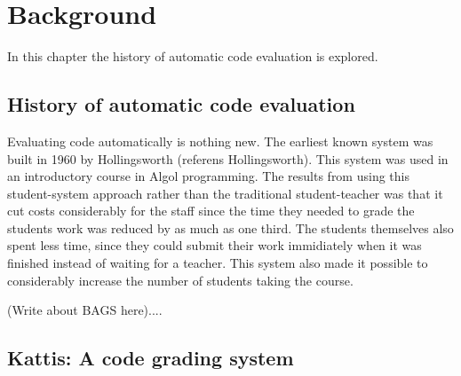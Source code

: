 \chapter{Background}
In this chapter the history of automatic code evaluation is explored.

\section{History of automatic code evaluation}
Evaluating code automatically is nothing new. The earliest known system was built in 1960 by Hollingsworth (referens Hollingsworth). This system was used in an introductory course in Algol programming. The results from using this student-system approach rather than the traditional student-teacher was that it cut costs considerably for the staff since the time they needed to grade the students work was reduced by as much as one third. The students themselves also spent less time, since they could submit their work immidiately when it was finished instead of waiting for a teacher. This system also made it possible to considerably increase the number of students taking the course.

(Write about BAGS here)....




\section{Kattis: A code grading system}

